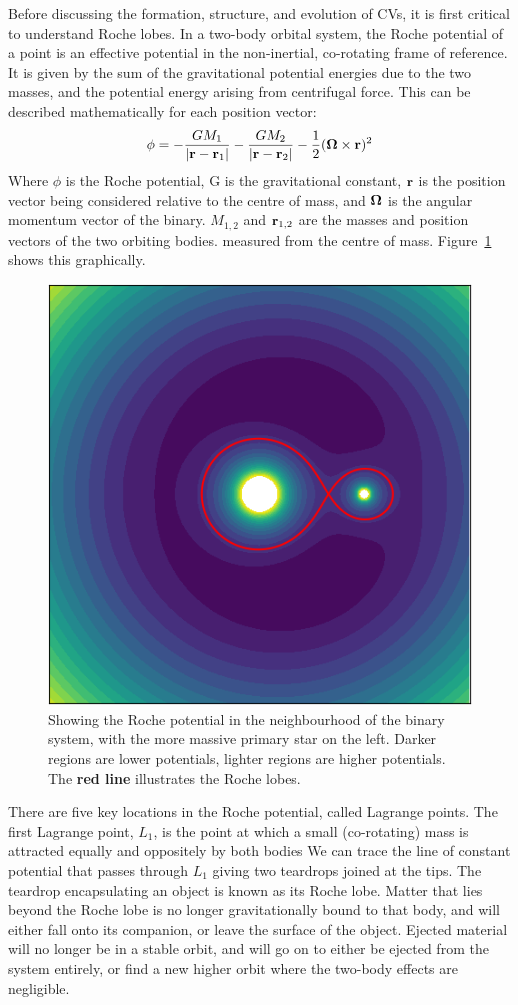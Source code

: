 Before discussing the formation, structure, and evolution of CVs, it is first critical to understand Roche lobes.
In a two-body orbital system, the Roche potential of a point is an effective potential in the non-inertial, co-rotating frame of reference. It is given by the sum of the gravitational potential energies due to the two masses, and the potential energy arising from centrifugal force. This can be described mathematically for each position vector:
\begin{equation}
    {\bf \phi} = -\frac{G M_1}{|{\bf r - r}_1|} - \frac{G M_2}{|{\bf r - r}_2|} - \frac{1}{2}({\bf \Omega} \times {\bf r})^2
\end{equation}
Where $\phi$ is the Roche potential, G is the gravitational constant, $\bf r$ is the position vector being considered relative to the centre of mass, and $\bf \Omega$ is the angular momentum vector of the binary. $M_{1,2}$ and ${\bf r}_{1,2}$ are the masses and position vectors of the two orbiting bodies. measured from the centre of mass. Figure~\ref{fig:roche} shows this graphically.
\begin{figure}
    \centering
    \includegraphics[width=.6\columnwidth]{figures/introduction/roche.png}
    \caption{Showing the Roche potential in the neighbourhood of the binary system, with the more massive primary star on the left. Darker regions are lower potentials, lighter regions are higher potentials. The {\bf red line} illustrates the Roche lobes.}
    \label{fig:roche}
\end{figure}

There are five key locations in the Roche potential, called Lagrange points. The first Lagrange point, $L_1$, is the point at which a small (co-rotating) mass is attracted equally and oppositely by both bodies
We can trace the line of constant potential that passes through $L_1$ giving two teardrops joined at the tips. The teardrop encapsulating an object is known as its Roche lobe.
Matter that lies beyond the Roche lobe is no longer gravitationally bound to that body, and will either fall onto its companion, or leave the surface of the object.
Ejected material will no longer be in a stable orbit, and will go on to either be ejected from the system entirely, or find a new higher orbit where the two-body effects are negligible.

